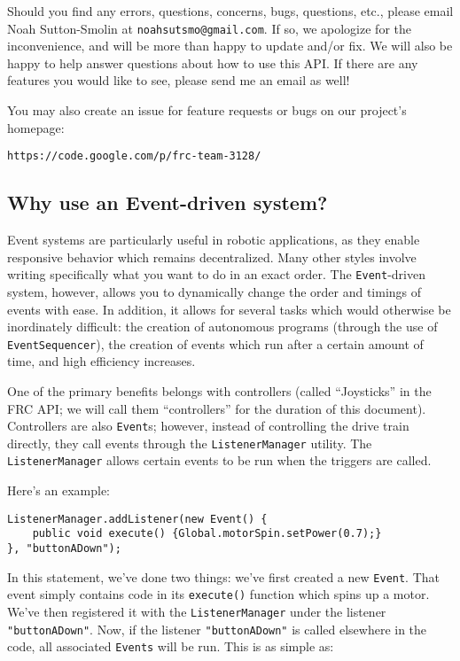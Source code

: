 \documentclass[a4paper]{article}
\begin{document}
Should you find any errors, questions, concerns, bugs, questions, etc., please email Noah Sutton-Smolin at \lstinline{noahsutsmo@gmail.com}. If so, we apologize for the inconvenience, and will be more than happy to update and/or fix. We will also be happy to help answer questions about how to use this API. If there are any features you would like to see, please send me an email as well!

You may also create an issue for feature requests or bugs on our project's homepage:\begin{verbatim}https://code.google.com/p/frc-team-3128/\end{verbatim}

\subsection{Why use an Event-driven system?}

Event systems are particularly useful in robotic applications, as they enable responsive behavior which remains decentralized. Many other styles involve writing specifically what you want to do in an exact order. The \lstinline{Event}-driven system, however, allows you to dynamically change the order and timings of events with ease. In addition, it allows for several tasks which would otherwise be inordinately difficult: the creation of autonomous programs (through the use of \lstinline{EventSequencer}), the creation of events which run after a certain amount of time, and high efficiency increases.

One of the primary benefits belongs with controllers (called ``Joysticks'' in the FRC API; we will call them ``controllers'' for the duration of this document). Controllers are also \lstinline{Event}s; however, instead of controlling the drive train directly, they call events through the \lstinline{ListenerManager} utility. The \lstinline{ListenerManager} allows certain events to be run when the triggers are called. 

Here's an example:

\begin{lstlisting}
ListenerManager.addListener(new Event() {
    public void execute() {Global.motorSpin.setPower(0.7);}
}, "buttonADown");
\end{lstlisting}

In this statement, we've done two things: we've first created a new \lstinline{Event}. That event simply contains code in its \lstinline{execute()} function which spins up a motor. We've then registered it with the \lstinline{ListenerManager} under the listener \lstinline{"buttonADown"}. Now, if the listener \lstinline{"buttonADown"} is called elsewhere in the code, all associated \lstinline{Events} will be run. This is as simple as:
\end{document}
